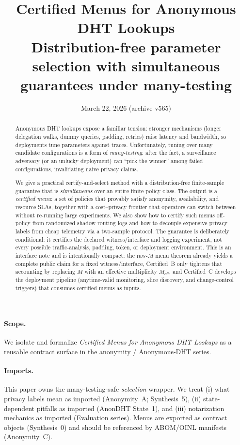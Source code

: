 \documentclass[11pt]{article}
\title{Certified Menus for Anonymous DHT Lookups\\
\large Distribution-free parameter selection with simultaneous guarantees under many-testing}
\author{}
\date{March 22, 2026 (archive v565)}
\begin{document}
\maketitle

\begin{abstract}
Anonymous DHT lookups expose a familiar tension: stronger mechanisms (longer delegation walks, dummy queries, padding, retries) raise latency and bandwidth, so deployments tune parameters against traces.
Unfortunately, tuning over many candidate configurations is a form of \emph{many-testing}: after the fact, a surveillance adversary (or an unlucky deployment) can ``pick the winner'' among failed configurations, invalidating naive privacy claims.

We give a practical certify-and-select method with a distribution-free finite-sample guarantee that is \emph{simultaneous} over an entire finite policy class.
The output is a \emph{certified menu}: a set of policies that provably satisfy anonymity, availability, and resource SLAs, together with a cost--privacy frontier that operators can switch between without re-running large experiments.
We also show how to certify such menus off-policy from randomized shadow-routing logs and how to decouple expensive privacy labels from cheap telemetry via a two-sample protocol.
The guarantee is deliberately conditional: it certifies the declared witness/interface and logging experiment, not every possible traffic-analysis, padding, token, or deployment environment.
This is an interface note and is intentionally compact: the raw-$M$ menu theorem already yields a complete public claim for a fixed witness/interface, Certified~B only tightens that accounting by replacing $M$ with an effective multiplicity $M_{\mathrm{eff}}$, and Certified~C develops the deployment pipeline (anytime-valid monitoring, slice discovery, and change-control triggers) that consumes certified menus as inputs.
\end{abstract}

\paragraph{Scope.}
We isolate and formalize \emph{Certified Menus for Anonymous DHT Lookups} as a reusable contract surface in the anonymity / Anonymous-DHT series.

\paragraph{Imports.}
This paper owns the many-testing-safe \emph{selection} wrapper.
We treat (i) what privacy labels mean as imported (Anonymity~A; Synthesis~5),\cite{series:oddsinflation,series:endpointbridge}
(ii) state-dependent pitfalls as imported (AnonDHT State~1),\cite{series:state1}
and (iii) notarization mechanics as imported (Evaluation series).
Menus are exported as contract objects (Synthesis~0) and should be referenced by ABOM/OINL manifests (Anonymity~C).\cite{series:contractobjects,series:abomoinl}
\end{document}
